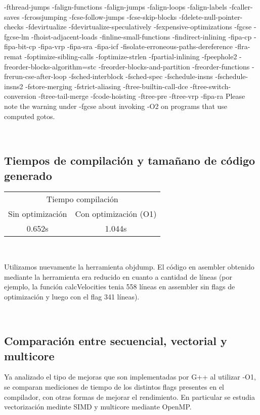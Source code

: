 -fthread-jumps 
-falign-functions  -falign-jumps 
-falign-loops  -falign-labels 
-fcaller-saves 
-fcrossjumping 
-fcse-follow-jumps  -fcse-skip-blocks 
-fdelete-null-pointer-checks 
-fdevirtualize -fdevirtualize-speculatively 
-fexpensive-optimizations 
-fgcse  -fgcse-lm  
-fhoist-adjacent-loads 
-finline-small-functions 
-findirect-inlining 
-fipa-cp 
-fipa-bit-cp 
-fipa-vrp 
-fipa-sra 
-fipa-icf 
-fisolate-erroneous-paths-dereference 
-flra-remat 
-foptimize-sibling-calls 
-foptimize-strlen 
-fpartial-inlining 
-fpeephole2 
-freorder-blocks-algorithm=stc 
-freorder-blocks-and-partition -freorder-functions 
-frerun-cse-after-loop  
-fsched-interblock  -fsched-spec 
-fschedule-insns  -fschedule-insns2 
-fstore-merging 
-fstrict-aliasing 
-ftree-builtin-call-dce 
-ftree-switch-conversion -ftree-tail-merge 
-fcode-hoisting 
-ftree-pre 
-ftree-vrp 
-fipa-ra
Please note the warning under -fgcse about invoking -O2 on programs that use computed gotos.



~\\

\subsection{Tiempos de compilación y tamañano de código generado}

\begin{center}
	\begin{tabular}{cc}  
		\toprule 
		\multicolumn{2}{c}{Tiempo compilación} \\
		\cmidrule(r){1-2}
		Sin optimización & Con optimización (O1) \\
		\midrule
		0.652s	&	1.044s	\\
		\bottomrule
	\end{tabular}\\
\end{center}


Utilizamos nuevamente la herramienta objdump. El código en asembler obtenido mediante la herramienta era reducido en cuanto a cantidad de líneas (por ejemplo, la función calcVelocities tenia 558 líneas en assembler sin flags de optimización y luego con el flag 341 líneas).

~\\



\subsection{Comparación entre secuencial, vectorial y multicore}
Ya analizado el tipo de mejoras que son implementadas por G++ al utilizar -O1, se comparan mediciones de tiempo de los distintos flags presentes en el compilador, con otras formas de mejorar el rendimiento. En particular se estudia vectorización medinte SIMD y multicore mediante OpenMP.

